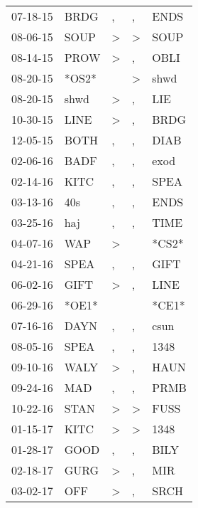 \begin{supertabular}{lllll}
 07-18-15 &   BRDG &                , &                , &   ENDS \\
 08-06-15 &   SOUP &     \textgreater &     \textgreater &   SOUP \\
 08-14-15 &   PROW &     \textgreater &                , &   OBLI \\
 08-20-15 &  *OS2* &                  &     \textgreater &   shwd \\
 08-20-15 &   shwd &     \textgreater &                , &    LIE \\
 10-30-15 &   LINE &     \textgreater &                , &   BRDG \\
 12-05-15 &   BOTH &                , &                , &   DIAB \\
 02-06-16 &   BADF &                , &                , &   exod \\
 02-14-16 &   KITC &                , &                , &   SPEA \\
 03-13-16 &    40s &                , &                , &   ENDS \\
 03-25-16 &    haj &                , &                , &   TIME \\
 04-07-16 &    WAP &     \textgreater &                  &  *CS2* \\
 04-21-16 &   SPEA &                , &                , &   GIFT \\
 06-02-16 &   GIFT &     \textgreater &                , &   LINE \\
 06-29-16 &  *OE1* &                  &                  &  *CE1* \\
 07-16-16 &   DAYN &                , &                , &   csun \\
 08-05-16 &   SPEA &                , &                , &   1348 \\
 09-10-16 &   WALY &     \textgreater &                , &   HAUN \\
 09-24-16 &    MAD &                , &                , &   PRMB \\
 10-22-16 &   STAN &     \textgreater &     \textgreater &   FUSS \\
 01-15-17 &   KITC &     \textgreater &     \textgreater &   1348 \\
 01-28-17 &   GOOD &                , &                , &   BILY \\
 02-18-17 &   GURG &     \textgreater &                , &    MIR \\
 03-02-17 &    OFF &     \textgreater &                , &   SRCH \\

\end{supertabular}
